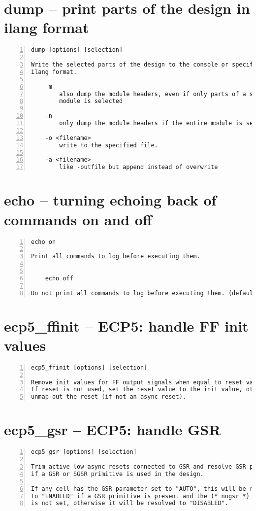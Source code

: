 \section{dump -- print parts of the design in ilang format}
\label{cmd:dump}
\begin{lstlisting}[numbers=left,frame=single]
    dump [options] [selection]

Write the selected parts of the design to the console or specified file in
ilang format.

    -m
        also dump the module headers, even if only parts of a single
        module is selected

    -n
        only dump the module headers if the entire module is selected

    -o <filename>
        write to the specified file.

    -a <filename>
        like -outfile but append instead of overwrite
\end{lstlisting}

\section{echo -- turning echoing back of commands on and off}
\label{cmd:echo}
\begin{lstlisting}[numbers=left,frame=single]
    echo on

Print all commands to log before executing them.


    echo off

Do not print all commands to log before executing them. (default)
\end{lstlisting}

\section{ecp5\_ffinit -- ECP5: handle FF init values}
\label{cmd:ecp5_ffinit}
\begin{lstlisting}[numbers=left,frame=single]
    ecp5_ffinit [options] [selection]

Remove init values for FF output signals when equal to reset value.
If reset is not used, set the reset value to the init value, otherwise
unmap out the reset (if not an async reset).
\end{lstlisting}

\section{ecp5\_gsr -- ECP5: handle GSR}
\label{cmd:ecp5_gsr}
\begin{lstlisting}[numbers=left,frame=single]
    ecp5_gsr [options] [selection]

Trim active low async resets connected to GSR and resolve GSR parameter,
if a GSR or SGSR primitive is used in the design.

If any cell has the GSR parameter set to "AUTO", this will be resolved
to "ENABLED" if a GSR primitive is present and the (* nogsr *) attribute
is not set, otherwise it will be resolved to "DISABLED".
\end{lstlisting}

